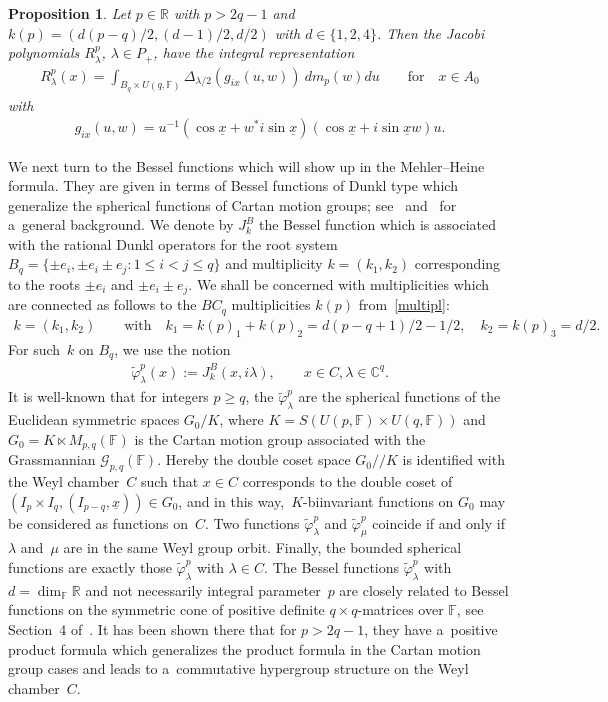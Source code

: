 \documentclass[pdftex]{sigma}
\numberwithin{equation}{section}
\newtheorem{Proposition}[Theorem]{Proposition}
{\theoremstyle{definition}
\newtheorem{Definition}[Theorem]{Definition}
\newtheorem{Note}[Theorem]{Note}
\newtheorem{Example}[Theorem]{Example}
\newtheorem{Remark}[Theorem]{Remark} }
\begin{document}
\begin{Proposition}
\label{int-rep-prop}
Let $p\in \mathbb R$ with $p>2q-1$ and $k(p)= (d(p-q)/2, (d-1)/2, d/2)$ with $d\in\{1,2,4\}$.
Then the Jacobi polynomials $ R_\lambda^p$, $\lambda \in P_+$, have the integral representation
\begin{gather}
\label{int-rep}
R_\lambda^p(x)= \int_{B_q\times U(q,\mathbb F)} \Delta_{\lambda/2}(g_{ix}(u,w))\> dm_p(w)du
\qquad
\text{for}
\quad
x\in A_0
\end{gather}
with
\begin{gather*}
g_{ix}(u,w)=u^{-1}(\cos\underline x+w^* i\sin \underline x)(\cos\underline x+i\sin \underline x w)u.
\end{gather*}
\end{Proposition}

We next turn to the Bessel functions which will show up in the Mehler--Heine formula.
They are given in terms of Bessel functions of Dunkl type which generalize the spherical functions of Cartan motion
groups; see~\cite{dJ} and~\cite{O} for a~general background.
We denote by $J_k^B$ the Bessel function which is associated with the rational Dunkl operators for the root system $B_q=
\{\pm e_i, \pm e_i \pm e_j: 1\leq i< j \leq q\}$ and multiplicity $k=(k_1, k_2)$ corresponding to the roots $\pm e_i$
and $\pm e_i \pm e_j$.
We shall be concerned with multiplicities which are connected as follows to the $BC_q$ multiplicities $k(p)$
from~\eqref{multipl}:
\begin{gather*}
k= (k_1, k_2)
\qquad
\text{with}
\quad
k_1=k(p)_1+k(p)_2=d(p-q+1)/2-1/2,
\quad
k_2=k(p)_3=d/2.
\end{gather*}
For such~$k$ on $B_q$, we use the notion
\begin{gather*}
\widetilde\varphi_\lambda^{p}(x):=J_k^B(x, i\lambda),
\qquad
x\in C, \lambda \in \mathbb C^q.
\end{gather*}
It is well-known that for integers $p\geq q$, the $\widetilde\varphi_\lambda^{p}$ are the spherical functions of the
Euclidean symmetric spaces $G_0/K$, where $K=S(U(p,\mathbb F)\times U(q,\mathbb F))$ and $G_0= K\ltimes M_{p,q}(\mathbb F)$
is the Cartan motion group associated with the Grassmannian $\mathcal G_{p,q}(\mathbb F)$. Hereby the double coset
space $G_0//K$ is identif\/ied with the Weyl chamber~$C$ such that $x\in C$ corresponds to the double coset of $(I_p\times
I_q, (I_{p-q},\underline x) ) \in G_0$, and in this way,~$K$-biinvariant functions on $G_0$ may be considered as
functions on~$C$.
Two functions $\widetilde\varphi_\lambda^{p}$ and $\widetilde\varphi_\mu^{p}$ coincide if and only if~$\lambda$
and~$\mu$ are in the same Weyl group orbit.
Finally, the bounded spherical functions are exactly those $\widetilde\varphi_\lambda^{p}$ with $\lambda\in C$.
The Bessel functions $\widetilde\varphi_\lambda^{p}$ with $d=\dim_\mathbb F\mathbb R$ and not necessarily
integral parameter~$p$ are closely related to Bessel functions on the symmetric cone of positive def\/inite $q\times
q$-matrices over $\mathbb F$, see Section~4 of~\cite{R1}.
It has been shown there that for $p>2q-1$, they have a~positive product formula which generalizes the product formula in
the Cartan motion group cases and leads to a~commutative hypergroup structure on the Weyl chamber~$C$.
\end{document}
